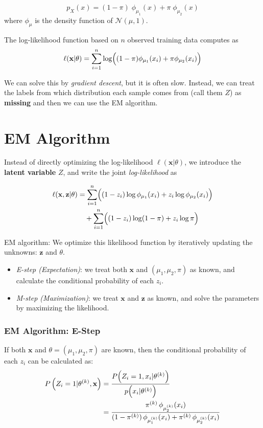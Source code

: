 \documentclass[
]{book}
\begin{document}
\[p_X(x) = (1-\pi) \;\phi_{\mu_1}(x) + \pi \; \phi_{\mu_2}(x)\]
where \(\phi_{\mu}\) is the density function of \(\mathcal{N}(\mu,1)\).

The log-likelihood function based on \(n\) observed training data computes as
\[\ell(\mathbf{x}|\theta) = \sum_{i=1}^{n} \log \Bigl( (1-\pi)\phi_{\mu_1}(x_i) + \pi \phi_{\mu_2}(x_i)\Bigr)\]

We can solve this by \emph{gradient descent}, but it is often slow. Instead, we can treat the labels from which distribution each sample comes from (call them \(Z\)) as \textbf{missing} and then we can use the EM algorithm.

\section{EM Algorithm}\label{em-algorithm}

Instead of directly optimizing the log-likelihood \(\ell(\mathbf{x}|\theta)\), we introduce the \textbf{latent variable} \(Z\), and write the joint \emph{log-likelihood} as

\begin{align*}
\ell(\mathbf{x}, \mathbf{z}|\theta) &= \sum_{i=1}^{n}  \Bigl( (1-z_i)\log \phi_{\mu_1}(x_i) + z_i \log \phi_{\mu_2}(x_i)\Bigr)\\
& \quad + \sum_{i=1}^{n} \Bigl( (1-z_i) \log(1-\pi) + z_i \log \pi\Bigr)
\end{align*}

EM algorithm: We optimize this likelihood function by iteratively updating the unknowns: \(\mathbf{z}\) and \(\theta\).

\begin{itemize}
\item
  \emph{E-step (Expectation)}: we treat both \(\mathbf{x}\) and \((\mu_1, \mu_2, \pi)\) as known, and calculate the conditional probability of each \(z_i\).
\item
  \emph{M-step (Maximization)}: we treat \(\mathbf{x}\) and \(\mathbf{z}\) as known, and solve the parameters by maximizing the likelihood.
\end{itemize}

\subsubsection*{EM Algorithm: E-Step}\label{em-algorithm-e-step}

If both \(\mathbf{x}\) and \(\theta=(\mu_1, \mu_2, \pi)\) are known, then the conditional probability of each \(z_i\) can be calculated as:
\begin{align*}
P\left( Z_i=1|\theta^{(k)}, \mathbf{x} \right) &= \frac{P \Bigl(Z_i=1, x_i|\theta^{(k)} \Bigr) }{p\Bigl(x_i|\theta^{(k)}\Bigr)}\\
&= \frac{\pi^{(k)}\,\phi_{\mu_2^{(k)}}(x_i)}{(1-\pi^{(k)})\,\phi_{\mu_1^{(k)}}(x_i) + \pi^{(k)}\,\phi_{\mu_2^{(k)}}(x_i)}
\end{align*}
\end{document}
